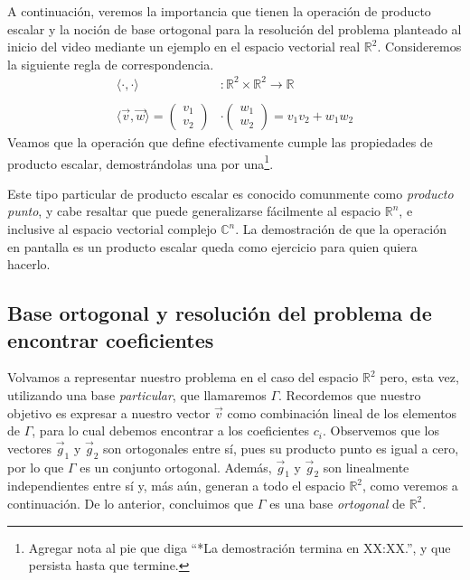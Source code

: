 \documentclass[12pt,dvipsnames]{article}
\numberwithin{equation}{section}
\begin{document}
A continuación, veremos la importancia que tienen la operación de producto escalar y la noción de base ortogonal para la resolución del problema planteado al inicio del video mediante un ejemplo en el espacio vectorial real $\mathbb{R}^2$. Consideremos la siguiente regla de correspondencia.
\begin{align*}
    \langle \cdot , \cdot \rangle&: \mathbb{R}^2\times\mathbb{R}^2\to \mathbb{R} \\ \\
    \langle \vec{v} , \vec{w} \rangle = \begin{pmatrix} v_1 \\ v_2 \end{pmatrix} &\cdot \begin{pmatrix} w_1 \\ w_2 \end{pmatrix} = v_1v_2 + w_1w_2
\end{align*}
\noindent Veamos que la operación que define efectivamente cumple las propiedades de producto escalar, demostrándolas una por una\footnote{Agregar nota al pie que diga ``*La demostración termina en XX:XX.'', y que persista hasta que termine.}.

Este tipo particular de producto escalar es conocido comunmente como \emph{producto punto}, y cabe resaltar que puede generalizarse fácilmente al espacio $\mathbb{R}^n$, e inclusive al espacio vectorial complejo $\mathbb{C}^n$. La demostración de que la operación en pantalla es un producto escalar queda como ejercicio para quien quiera hacerlo.


\subsection{Base ortogonal y resolución del problema de encontrar coeficientes}

Volvamos a representar nuestro problema en el caso del espacio $\mathbb{R}^2$ pero, esta vez, utilizando una base \emph{particular}, que llamaremos $\Gamma$. Recordemos que nuestro objetivo es expresar a nuestro vector $\vec{v}$ como combinación lineal de los elementos de $\Gamma$, para lo cual debemos encontrar a los coeficientes $c_i$. Observemos que los vectores $\vec{g}_1$ y $\vec{g}_2$ son ortogonales entre sí, pues su producto punto es igual a cero, por lo que $\Gamma$ es un conjunto ortogonal. Además, $\vec{g}_1$ y $\vec{g}_2$ son linealmente independientes entre sí y, más aún, generan a todo el espacio $\mathbb{R}^2$, como veremos a continuación. De lo anterior, concluimos que $\Gamma$ es una base \emph{ortogonal} de $\mathbb{R}^2$.
\end{document}
